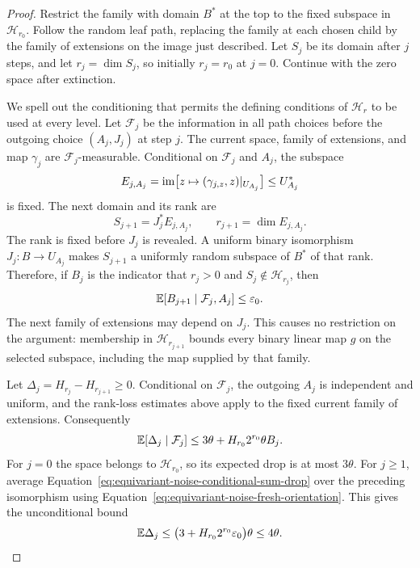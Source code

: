 \begin{proof}
Restrict the family with domain $B^*$ at the top to the fixed subspace in $\mathcal H_{r_0}$.  Follow the random leaf path, replacing the family at each
chosen child by the family of extensions on the image just described.  Let $S_j$ be its domain
after $j$ steps, and let $r_j=\dim S_j$, so initially $r_j=r_0$ at $j=0$.
Continue with the zero space after extinction.

We spell out the conditioning that permits the defining conditions of $\mathcal H_r$ to be used at every
level.  Let $\mathcal F_j$ be the information in all path choices before
the outgoing choice $(A_j,J_j)$ at step $j$.  The current space, family of extensions,
and map $\gamma_j$ are $\mathcal F_j$-measurable.
Conditional on $\mathcal F_j$ and $A_j$, the subspace
\[
 E_{j,A_j}
 =\operatorname{im}\bigl[z\mapsto(\gamma_{j,z},z)|_{U_{A_j}}\bigr]
 \le U_{A_j}^*
\]
is fixed.  The next domain and its rank are
\[
 S_{j+1}=J_j^*E_{j,A_j},
 \qquad r_{j+1}=\dim E_{j,A_j}.
\]
The rank is fixed before $J_j$ is revealed.  A uniform binary
isomorphism $J_j:B\to U_{A_j}$ makes $S_{j+1}$ a uniformly random
subspace of $B^*$ of that rank.  Therefore, if $B_j$ is the indicator
that $r_j>0$ and $S_j\notin\mathcal H_{r_j}$, then
\begin{equation}\label{eq:equivariant-noise-fresh-orientation}
 \mathbb E[B_{j+1}\mid\mathcal F_j,A_j]\le\varepsilon_0.
\end{equation}
The next family of extensions may depend on $J_j$.  This causes no restriction on the
argument: membership in $\mathcal H_{r_{j+1}}$ bounds every binary linear map $g$ on the selected
subspace, including the map supplied by that family.

Let $\Delta_j=H_{r_j}-H_{r_{j+1}}\ge0$.
Conditional on $\mathcal F_j$, the outgoing $A_j$ is independent and
uniform, and the rank-loss estimates above apply to the fixed current
family of extensions.  Consequently
\begin{equation}\label{eq:equivariant-noise-conditional-sum-drop}
 \mathbb E[\Delta_j\mid\mathcal F_j]
 \le3\theta+H_{r_0}2^{r_0}\theta B_j.
\end{equation}
For $j=0$ the space belongs to $\mathcal H_{r_0}$, so its expected drop is at most
$3\theta$.  For $j\ge1$, average Equation~\eqref{eq:equivariant-noise-conditional-sum-drop}
over the preceding isomorphism using
Equation~\eqref{eq:equivariant-noise-fresh-orientation}.  This gives the unconditional
bound
\[
 \mathbb E\Delta_j
 \le\bigl(3+H_{r_0}2^{r_0}\varepsilon_0\bigr)\theta
 \le4\theta.
\]


\end{proof}
